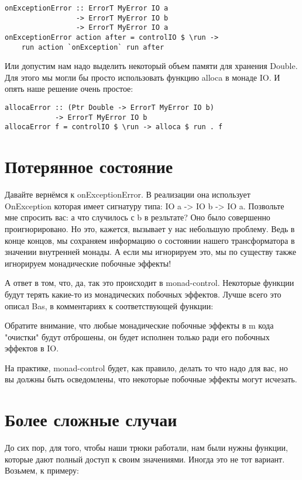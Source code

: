 \begin{lstlisting}
onExceptionError :: ErrorT MyError IO a
                 -> ErrorT MyError IO b
                 -> ErrorT MyError IO a
onExceptionError action after = controlIO $ \run ->
    run action `onException` run after
\end{lstlisting}

Или допустим нам надо выделить некоторый объем памяти для хранения Double. Для
этого мы могли бы просто использовать функцию alloca в монаде IO. И опять наше
решение очень простое:

\begin{lstlisting}
allocaError :: (Ptr Double -> ErrorT MyError IO b)
            -> ErrorT MyError IO b
allocaError f = controlIO $ \run -> alloca $ run . f
\end{lstlisting}

\section{Потерянное состояние}
Давайте вернёмся к onExceptionError. В реализации она использует OnException
которая имеет сигнатуру типа: IO a -> IO b -> IO a. Позвольте мне спросить вас:
а что случилось с b в резльтате? Оно было совершенно проигнорировано. Но это,
кажется, вызывает у нас небольшую проблему. Ведь в конце концов, мы сохраняем
информацию о состоянии нашего трансформатора в значении внутренней монады. А
если мы игнорируем это, мы по существу также игнорируем монадические побочные
эффекты!

А ответ в том, что, да, так это происходит в monad-control. Некоторые функции
будут терять какие-то из монадических побочных эффектов. Лучше всего это описал
Bas, в комментариях к соответствующей функции:

Обратите внимание, что любые монадические побочные эффекты в m кода "очистки"
будут отброшены, он будет исполнен только ради его побочных эффектов в IO.

На практике, monad-control будет, как правило, делать то что надо для вас, но
вы должны быть осведомлены, что некоторые побочные эффекты могут исчезать.

\section{Более сложные случаи}
До сих пор, для того, чтобы наши трюки работали, нам были нужны функции,
которые дают полный доступ к своим значениями. Иногда это не тот вариант.
Возьмем, к примеру:

